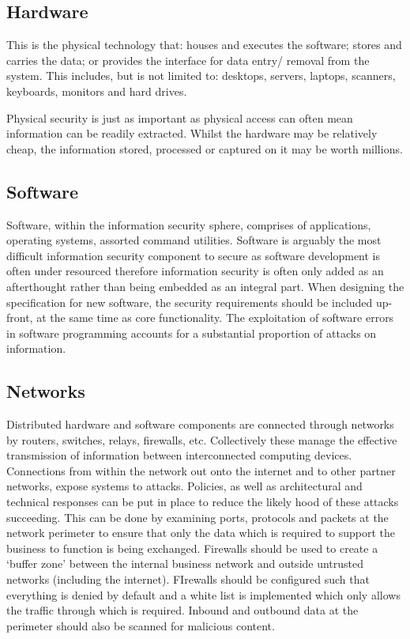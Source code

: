 \subsection*{Hardware}
This is the physical technology that: houses and executes the software; stores and carries the data; or provides the interface for data entry/ removal from the system. This includes, but is not limited to: desktops, servers, laptops, scanners, keyboards, monitors and hard drives.

Physical security is just as important as physical access can often mean information can be readily extracted. Whilst the hardware may be relatively cheap, the information stored, processed or captured on it may be worth millions. 

\subsection*{Software}
Software, within the information security sphere, comprises of applications, operating systems, assorted command utilities. Software is arguably the most difficult information security component to secure as software development is often under resourced therefore information security is often only added as an afterthought rather than being embedded as an integral part. When designing the specification for new software, the security requirements should be included up-front, at the same time as core functionality. The exploitation of software errors in software programming accounts for a substantial proportion of attacks on information. 

\subsection*{Networks}
Distributed hardware and software components are connected through networks by routers, switches, relays, firewalls, etc. Collectively these manage the effective transmission of information between interconnected computing devices. Connections from within the network out onto the internet and to other partner networks, expose systems to attacks. Policies, as well as architectural and technical responses can be put in place to reduce the likely hood of these attacks succeeding. This can be done by examining ports, protocols and packets at the network perimeter to ensure that only the data which is required to support the business to function is being exchanged. Firewalls should be used to create a `buffer zone' between the internal business network and outside untrusted networks (including the internet). FIrewalls should be configured such that everything is denied by default and a white list is implemented which only allows the traffic through which is required. Inbound and outbound data at the perimeter should also be scanned for malicious content. 

